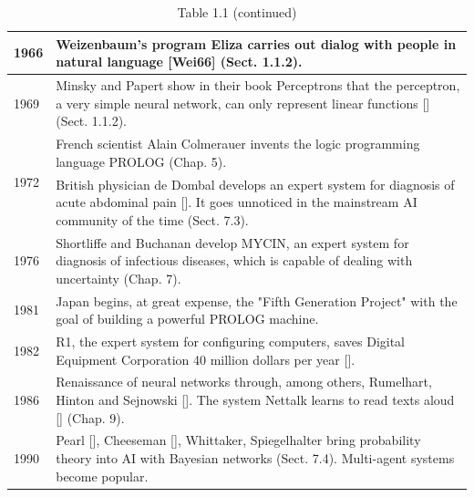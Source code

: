 \documentclass[10pt]{book}
\begin{document}
\begin{table}
\begin{tabular}{|l|l|}
\hline
1966 & Weizenbaum's program Eliza carries out dialog with people in natural language [Wei66] (Sect. 1.1.2). \\
\hline
1969 & Minsky and Papert show in their book Perceptrons that the perceptron, a very simple neural network, can only represent linear functions [\cite{minsky1969perceptrons}] (Sect. 1.1.2). \\
\hline
\multirow[t]{2}{*}{1972} & French scientist Alain Colmerauer invents the logic programming language PROLOG (Chap. 5). \\
 & British physician de Dombal develops an expert system for diagnosis of acute abdominal pain [\cite{dedombal1972cad}]. It goes unnoticed in the mainstream AI community of the time (Sect. 7.3). \\
\hline
1976 & Shortliffe and Buchanan develop MYCIN, an expert system for diagnosis of infectious diseases, which is capable of dealing with uncertainty (Chap. 7). \\
\hline
1981 & Japan begins, at great expense, the "Fifth Generation Project" with the goal of building a powerful PROLOG machine. \\
\hline
1982 & R1, the expert system for configuring computers, saves Digital Equipment Corporation 40 million dollars per year [\cite{mcdermott1982r1}]. \\
\hline
1986 & Renaissance of neural networks through, among others, Rumelhart, Hinton and Sejnowski [\cite{rumelhart1986pdp}]. The system Nettalk learns to read texts aloud [\cite{sejnowski1986nettalk}] (Chap. 9). \\
\hline
1990 & Pearl [\cite{pearl1988probabilistic}], Cheeseman [\cite{cheeseman1985defense}], Whittaker, Spiegelhalter bring probability theory into AI with Bayesian networks (Sect. 7.4). Multi-agent systems become popular. \\
\hline
\end{tabular}
\caption{Table 1.1 (continued)}
\end{table}
\end{document}
